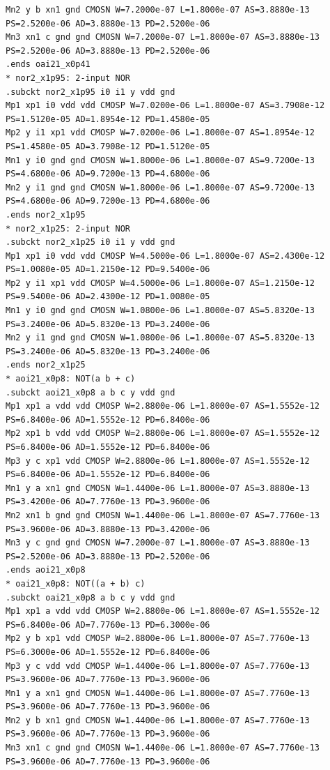 \documentclass[10pt,a4paper]{article}
\begin{document}
{\begin{verbatim}
Mn2 y b xn1 gnd CMOSN W=7.2000e-07 L=1.8000e-07 AS=3.8880e-13 PS=2.5200e-06 AD=3.8880e-13 PD=2.5200e-06
Mn3 xn1 c gnd gnd CMOSN W=7.2000e-07 L=1.8000e-07 AS=3.8880e-13 PS=2.5200e-06 AD=3.8880e-13 PD=2.5200e-06
.ends oai21_x0p41
* nor2_x1p95: 2-input NOR
.subckt nor2_x1p95 i0 i1 y vdd gnd
Mp1 xp1 i0 vdd vdd CMOSP W=7.0200e-06 L=1.8000e-07 AS=3.7908e-12 PS=1.5120e-05 AD=1.8954e-12 PD=1.4580e-05
Mp2 y i1 xp1 vdd CMOSP W=7.0200e-06 L=1.8000e-07 AS=1.8954e-12 PS=1.4580e-05 AD=3.7908e-12 PD=1.5120e-05
Mn1 y i0 gnd gnd CMOSN W=1.8000e-06 L=1.8000e-07 AS=9.7200e-13 PS=4.6800e-06 AD=9.7200e-13 PD=4.6800e-06
Mn2 y i1 gnd gnd CMOSN W=1.8000e-06 L=1.8000e-07 AS=9.7200e-13 PS=4.6800e-06 AD=9.7200e-13 PD=4.6800e-06
.ends nor2_x1p95
* nor2_x1p25: 2-input NOR
.subckt nor2_x1p25 i0 i1 y vdd gnd
Mp1 xp1 i0 vdd vdd CMOSP W=4.5000e-06 L=1.8000e-07 AS=2.4300e-12 PS=1.0080e-05 AD=1.2150e-12 PD=9.5400e-06
Mp2 y i1 xp1 vdd CMOSP W=4.5000e-06 L=1.8000e-07 AS=1.2150e-12 PS=9.5400e-06 AD=2.4300e-12 PD=1.0080e-05
Mn1 y i0 gnd gnd CMOSN W=1.0800e-06 L=1.8000e-07 AS=5.8320e-13 PS=3.2400e-06 AD=5.8320e-13 PD=3.2400e-06
Mn2 y i1 gnd gnd CMOSN W=1.0800e-06 L=1.8000e-07 AS=5.8320e-13 PS=3.2400e-06 AD=5.8320e-13 PD=3.2400e-06
.ends nor2_x1p25
* aoi21_x0p8: NOT(a b + c)
.subckt aoi21_x0p8 a b c y vdd gnd
Mp1 xp1 a vdd vdd CMOSP W=2.8800e-06 L=1.8000e-07 AS=1.5552e-12 PS=6.8400e-06 AD=1.5552e-12 PD=6.8400e-06
Mp2 xp1 b vdd vdd CMOSP W=2.8800e-06 L=1.8000e-07 AS=1.5552e-12 PS=6.8400e-06 AD=1.5552e-12 PD=6.8400e-06
Mp3 y c xp1 vdd CMOSP W=2.8800e-06 L=1.8000e-07 AS=1.5552e-12 PS=6.8400e-06 AD=1.5552e-12 PD=6.8400e-06
Mn1 y a xn1 gnd CMOSN W=1.4400e-06 L=1.8000e-07 AS=3.8880e-13 PS=3.4200e-06 AD=7.7760e-13 PD=3.9600e-06
Mn2 xn1 b gnd gnd CMOSN W=1.4400e-06 L=1.8000e-07 AS=7.7760e-13 PS=3.9600e-06 AD=3.8880e-13 PD=3.4200e-06
Mn3 y c gnd gnd CMOSN W=7.2000e-07 L=1.8000e-07 AS=3.8880e-13 PS=2.5200e-06 AD=3.8880e-13 PD=2.5200e-06
.ends aoi21_x0p8
* oai21_x0p8: NOT((a + b) c)
.subckt oai21_x0p8 a b c y vdd gnd
Mp1 xp1 a vdd vdd CMOSP W=2.8800e-06 L=1.8000e-07 AS=1.5552e-12 PS=6.8400e-06 AD=7.7760e-13 PD=6.3000e-06
Mp2 y b xp1 vdd CMOSP W=2.8800e-06 L=1.8000e-07 AS=7.7760e-13 PS=6.3000e-06 AD=1.5552e-12 PD=6.8400e-06
Mp3 y c vdd vdd CMOSP W=1.4400e-06 L=1.8000e-07 AS=7.7760e-13 PS=3.9600e-06 AD=7.7760e-13 PD=3.9600e-06
Mn1 y a xn1 gnd CMOSN W=1.4400e-06 L=1.8000e-07 AS=7.7760e-13 PS=3.9600e-06 AD=7.7760e-13 PD=3.9600e-06
Mn2 y b xn1 gnd CMOSN W=1.4400e-06 L=1.8000e-07 AS=7.7760e-13 PS=3.9600e-06 AD=7.7760e-13 PD=3.9600e-06
Mn3 xn1 c gnd gnd CMOSN W=1.4400e-06 L=1.8000e-07 AS=7.7760e-13 PS=3.9600e-06 AD=7.7760e-13 PD=3.9600e-06

\end{verbatim}}
\end{document}
